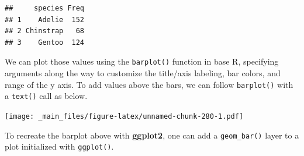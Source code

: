 \documentclass[
]{book}
\newenvironment{Shaded}{\begin{snugshade}}{\end{snugshade}}
\newcommand{\AttributeTok}[1]{\textcolor[rgb]{0.77,0.63,0.00}{#1}}
\newcommand{\DecValTok}[1]{\textcolor[rgb]{0.00,0.00,0.81}{#1}}
\newcommand{\FunctionTok}[1]{\textcolor[rgb]{0.00,0.00,0.00}{#1}}
\newcommand{\NormalTok}[1]{#1}
\newcommand{\OtherTok}[1]{\textcolor[rgb]{0.56,0.35,0.01}{#1}}
\newcommand{\SpecialCharTok}[1]{\textcolor[rgb]{0.00,0.00,0.00}{#1}}
\newcommand{\StringTok}[1]{\textcolor[rgb]{0.31,0.60,0.02}{#1}}
\begin{document}
\begin{verbatim}
##     species Freq
## 1    Adelie  152
## 2 Chinstrap   68
## 3    Gentoo  124
\end{verbatim}

We can plot those values using the \texttt{barplot()} function in base R, specifying arguments along the way to customize the title/axis labeling, bar colors, and range of the y axis. To add values above the bars, we can follow \texttt{barplot()} with a \texttt{text()} call as below.

\begin{Shaded}
\end{Shaded}

\texttt{[image: \_main\_files/figure-latex/unnamed-chunk-280-1.pdf]}

To recreate the barplot above with \textbf{ggplot2}, one can add a \texttt{geom\_bar()} layer to a plot initialized with \texttt{ggplot()}.
\end{document}
